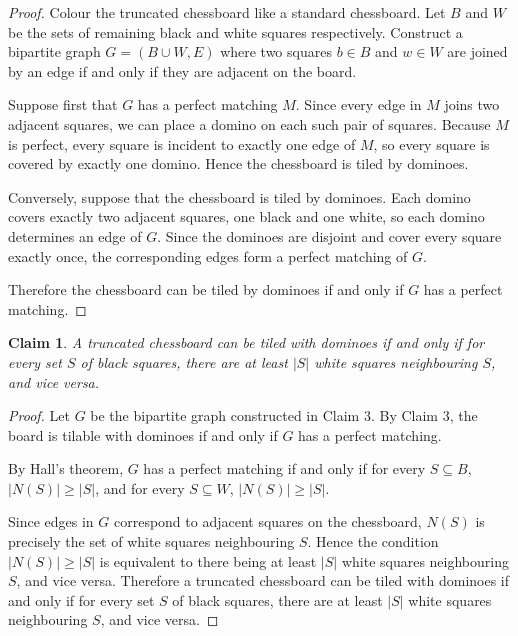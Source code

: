 \documentclass{article}
\newtheorem{claim}{Claim}
\begin{document}
\begin{proof}
    Colour the truncated chessboard like a standard chessboard. Let $B$
    and $W$ be the sets of remaining black and white squares respectively.
    Construct a bipartite graph $G = (B \cup W, E)$ where two squares
    $b \in B$ and $w \in W$ are joined by an edge if and only if they
    are adjacent on the board.

    \medskip
    
    Suppose first that $G$ has a perfect matching $M$.
    Since every edge in $M$ joins two adjacent squares, we can place a
    domino on each such pair of squares. Because $M$ is perfect, every
    square is incident to exactly one edge of $M$, so every square is
    covered by exactly one domino. Hence the chessboard is tiled by
    dominoes.

    \medskip
    
    Conversely, suppose that the chessboard is tiled by dominoes.
    Each domino covers exactly two adjacent squares, one black and one white,
    so each domino determines an edge of $G$. Since the dominoes are disjoint
    and cover every square exactly once, the corresponding edges form a perfect
    matching of $G$.

    \medskip
    
    Therefore the chessboard can be tiled by dominoes if and only if
    $G$ has a perfect matching.
\end{proof}

\begin{claim}
    A truncated chessboard can be tiled with dominoes if and only if for every
    set $S$ of black squares, there are at least $|S|$ white squares neighbouring
    $S$, and vice versa.
\end{claim}

\begin{proof}
    Let $G$ be the bipartite graph constructed in Claim 3. By Claim 3, the board is
    tilable with dominoes if and only if $G$ has a perfect matching.

    \medskip

    By Hall's theorem, $G$ has a perfect matching if and only if for every
    $S \subseteq B$, $|N(S)| \geq |S|$, and for every $S \subseteq W$,
    $|N(S)| \geq |S|$.

    \medskip

    Since edges in $G$ correspond to adjacent squares on the chessboard,
    $N(S)$ is precisely the set of white squares neighbouring $S$. Hence
    the condition $|N(S)| \geq |S|$ is equivalent to there being at least
    $|S|$ white squares neighbouring $S$, and vice versa. Therefore a
    truncated chessboard can be tiled with dominoes if and only if for
    every set $S$ of black squares, there are at least $|S|$ white squares
    neighbouring $S$, and vice versa.
\end{proof}
\end{document}
